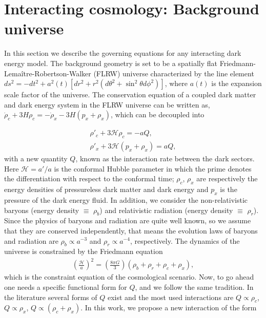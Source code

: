 \documentclass[superscriptaddress,oneolumn,secnumarabic,
amssymb,amsmath,nobibnotes,aps,prd,showpacs,nofootinbib]{revtex4}%
\begin{document}
\section{Interacting cosmology: Background universe}
\label{sec-2}

In this section we describe the governing equations for any
interacting dark energy model. The background geometry is set
to be a spatially flat Friedmann-Lema\^itre-Robertson-Walker (FLRW) universe characterized by
the line element $ds^2 = - dt^2 + a^2 (t) \left[ dr^2 + r^2 \left(d \theta ^2+ \sin^2 \theta d \phi^2\right)\right]$, where $a(t)$ is the expansion scale factor of the universe. The conservation equation of a coupled dark matter and
dark energy system in the FLRW universe can be written as, $\dot{\rho}_c + 3 H \rho_c = - \dot{\rho}_x - 3 H (p_x +\rho_x)$, which can be decoupled into


\begin{eqnarray}
\rho'_c+ 3 \mathcal{H} \rho_c=-aQ,\label{cons1} \\
\rho'_x+ 3 \mathcal{H} (p_x+\rho_x)=aQ,\label{cons2}
\end{eqnarray}
with a new quantity $Q$, known as the interaction rate between the dark sectors. Here $\mathcal{H}=a'/a$ is the conformal Hubble parameter in which the prime denotes the differentiation with respect to the conformal time;
$\rho_c$, $\rho_x$ are respectively the energy densities of pressureless dark matter and dark energy and $p_x$ is the pressure of the dark energy fluid. In addition, we consider the non-relativistic baryons (energy density $\equiv$ $\rho_b$) and relativistic radiation (energy density $\equiv$ $\rho_r$). Since the physics of baryons and radiation are quite well known, so we assume that they are conserved independently, that means the evolution laws of baryons and radiation are $\rho_b \propto a^{-3}$ and $\rho_r \propto a^{-4}$, respectively. The dynamics of the universe is constrained by the Friedmann equation
\begin{eqnarray}
\left(\frac{\mathcal{H}}{a}\right)^2 = \left(\frac{8 \pi G}{3}\right)(\rho_b+\rho_r+ \rho_c+\rho_x),
\end{eqnarray}
which is the constraint equation of the cosmological scenario.  Now, to go ahead one needs a specific functional form for $Q$, and we follow the same tradition. In the literature several forms of $Q$ exist and the most used interactions are $Q \propto \rho_c$, $Q \propto \rho_x$, $Q \propto (\rho_c+\rho_x)$. In this work, we propose a new interaction of the form
\end{document}

